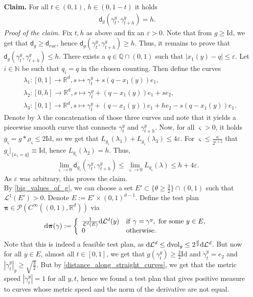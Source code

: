 \documentclass[a4paper,10pt]{article}
\numberwithin{equation}{section}
\newcommand{\R}{\mathbb{R}}
\newcommand{\Q}{\mathbb{Q}}
\newcommand{\N}{\mathbb{N}}
\newcommand{\e}{\varepsilon}
\newcommand{\vol}{\mathrm{vol}}
\newcommand{\sfd}{\mathsf d}
\newcommand{\di}{{\rm d}}
\begin{document}
\textbf{Claim.}
For all $t \in (0,1)$, $h \in (0, 1-t)$ it holds
\begin{align} \label{distance_along_straight_curves}
    \sfd_g(\gamma^y_t, \gamma^y_{t+h})=h. 
\end{align}
\textit{Proof of the claim.} Fix $t, h$ as above and fix an $\e>0$. Note that from $g \geq \mathrm{Id}$, we get that $\sfd_g \geq \sfd_{euc}$, hence $\sfd_g(\gamma^y_t, \gamma^y_{t+h})\geq h$. Thus, it remains to prove that $\sfd_g(\gamma^y_t, \gamma^y_{t+h}) \leq h$.   There exists a $q \in \Q\cap (0,1)$ such that $|x_1(y)-q|\leq \e$. Let $i\in \N$ be such that $q_i = q$ in the chosen counting.  Then define the curves
\begin{align*}
    &\lambda_1:[0, 1] \to \R^d, s \mapsto  \gamma^y_t + s(q-x_1(y))e_1, \\
    &\lambda_2:[0,h]\to \R^d, s \mapsto \gamma^y_t + (q-x_1(y))e_1 + se_2, \\
    &\lambda_3:[0, 1] \to \R^d, s \mapsto \gamma^y_t + (q-x_1(y))e_1 + he_2 -s(q-x_1(y))e_1. 
\end{align*}
Denote by $\lambda$ the concatenation of those three curves and note that it yields a piecewise smooth curve that connects $\gamma^y_t$ and $\gamma^y_{t+h}$.
Now, for all $\varsigma>0$, it holds $g_\varsigma = g * \rho_\varsigma \leq 2\mathrm{Id}$, so we get that $L_{g_\varsigma}(\lambda_1)+ L_{g_\varsigma}(\lambda_3) \leq 4\e$.  
For $\varsigma \leq \frac{\kappa}{2^{i+2}}$ that $g_\varsigma|_{\{x_1=q\}}\equiv \mathrm{Id}$, hence $L_{g_\varsigma}(\lambda_2) =h$. 
Thus, 
\begin{align*}
    \lim_{\varsigma \to 0} \sfd_{g_\varsigma}(\gamma^y_t, \gamma^y_{t+h}) \leq \lim_{\varsigma \to 0} L_{g_\varsigma}(\lambda) \leq h+4\e.
\end{align*}
As $\e$ was arbitrary, this proves the claim. \\

By \eqref{big_values_of_g}, we can choose a set $E'\subset \{\theta \geq \frac{3}{2}\big\}\cap (0,1)$ such that $\mathcal{L}^1(E')>0$. Denote $E:= E' \times (0,1)^{d-1}$. Define the test plan $\boldsymbol{\pi} \in \mathcal{P}(C^\infty((0,1), \R^d))$ via
\begin{align*}
    \di\boldsymbol{\pi}(\gamma):= \left\{ \begin{array}{ll}
           \frac{1}{\mathcal{L}^d(E)}\di\mathcal{L}^d(y) & \mathrm{if}\ \gamma = \gamma^{y}, \ \mathrm{for \ some} \ y \in  E, \\
           0\  & \mathrm{otherwise}.
        \end{array}\right.
\end{align*}
Note that this is indeed a feasible test plan, as $\di\mathcal{L}^d \leq \di\vol_g \leq 2^{\frac{d}{2}}\di\mathcal{L}^d$.
But now for all $y\in E$, almost all $t\in [0,1]$, we get that $g(\gamma^y_t) \geq \frac{3}{2}\mathrm{Id}$ and $\dot{\gamma}^y_t = e_2$ and $|\dot{\gamma}^y_t|_g \geq \sqrt{\frac{3}{2}}$. But by \eqref{distance_along_straight_curves}, we get that the metric speed $|\dot{\gamma}^y_t| =1$ for all $y, t$, hence we found a test plan that gives positive measure to curves whose metric speed and the norm of the derivative are not equal. 
\end{document}
